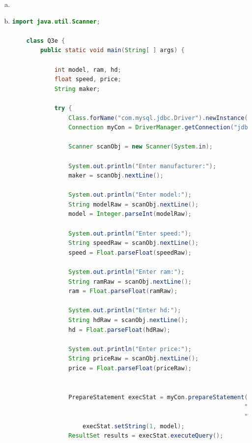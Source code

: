 \documentclass[12pt]{article}
\begin{document}
\begin{enumerate}[1.]
\begin{enumerate}[a)]
\begin{lstlisting}[language=JAVA]
                            printf("model=%d, color=%s, price=%.2f, maker=%c, type=%s",
                            model, color ? "true" : "false", price, maker, type);
                        }
                    }
                }

            } catch (SQLException ex) {
                // handle the error
                System.out.println("Error occured while establishing database connection");
            }
        }
    }
    \end{lstlisting}

        \item

        \item

    \begin{lstlisting}[language=JAVA]
    import java.util.Scanner;

    class Q3e {
        public static void main(String[ ] args) {

            int model, ram, hd;
            float speed, price;
            String maker;

            try {
                Class.forName("com.mysql.jdbc.Driver").newInstance();
                Connection myCon = DriverManager.getConnection("jdbc:mysql://localhost/Q3");

                Scanner scanObj = new Scanner(System.in);

                System.out.println("Enter manufacturer:");
                maker = scanObj.nextLine();

                System.out.println("Enter model:");
                String modelRaw = scanObj.nextLine();
                model = Integer.parseInt(modelRaw);

                System.out.println("Enter speed:");
                String speedRaw = scanObj.nextLine();
                speed = Float.parseFloat(speedRaw);

                System.out.println("Enter ram:");
                String ramRaw = scanObj.nextLine();
                ram = Float.parseFloat(ramRaw);

                System.out.println("Enter hd:");
                String hdRaw = scanObj.nextLine();
                hd = Float.parseFloat(hdRaw);

                System.out.println("Enter price:");
                String priceRaw = scanObj.nextLine();
                price = Float.parseFloat(priceRaw);


                PrepareStatement execStat = myCon.prepareStatement("SELECT Product.model AS m1, PC.model AS m2 FROM " +
                                                                  "Product FULL OUTER JOIN PC" +
                                                                  "WHERE model = ?");
                    execStat.setString(1, model);
                ResultSet results = execStat.executeQuery();


\end{lstlisting}
\end{enumerate}
\end{enumerate}
\end{document}
